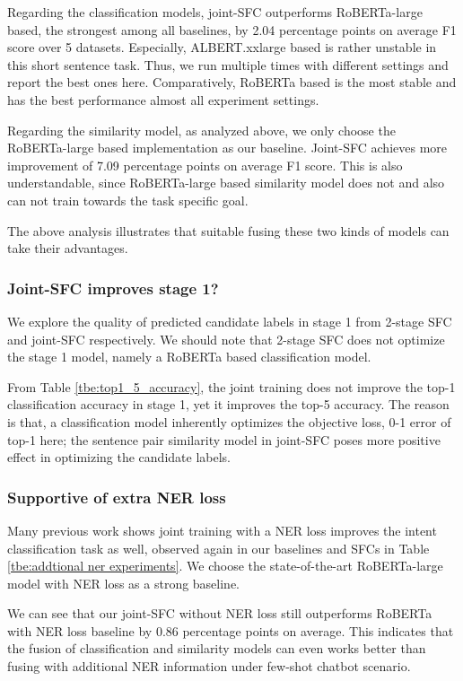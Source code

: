 Regarding the classification models, joint-SFC outperforms RoBERTa-large based, the strongest among all baselines, by 2.04 percentage points on average F1 score over 5 datasets. 
Especially, ALBERT.xxlarge based is rather unstable in this short sentence task. 
Thus, we run multiple times with different settings and report the best ones here. 
Comparatively, RoBERTa based is the most stable and has the best performance almost all experiment settings.

Regarding the similarity model, as analyzed above, we only choose the RoBERTa-large based implementation as our baseline. 
Joint-SFC achieves more improvement of 7.09 percentage points on average F1 score. 
This is also understandable, since RoBERTa-large based similarity model does not and also can not train towards the task specific goal.

The above analysis illustrates that suitable fusing these two kinds of models can take their advantages.

\subsubsection*{Joint-SFC improves stage 1?}
We explore the quality of predicted candidate labels in stage 1 from 2-stage SFC and joint-SFC respectively. 
We should note that 2-stage SFC does not optimize the stage 1 model, namely a RoBERTa based classification model.

From Table \ref{tbe:top1_5_accuracy}, the joint training does not improve the top-1 classification accuracy in stage 1, yet it improves the top-5 accuracy.
The reason is that, a classification model inherently optimizes the objective loss, 0-1 error of top-1 here; the sentence pair similarity model in joint-SFC poses more positive effect in optimizing the candidate labels.

\subsubsection*{Supportive of extra NER loss}
Many previous work shows joint training with a NER loss improves the intent classification task as well, observed again in our baselines and SFCs in Table \ref{tbe:addtional ner experiments}.
We choose the state-of-the-art RoBERTa-large model with NER loss as a strong baseline. 

We can see that our joint-SFC without NER loss still outperforms RoBERTa with NER loss baseline by 0.86 percentage points on average. 
This indicates that the fusion of classification and similarity models can even works better than fusing with additional NER information under few-shot chatbot scenario. 

